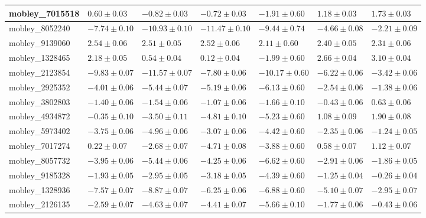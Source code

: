 \documentclass{article}
\begin{document}
\begin{landscape}
\begin{longtable}{|l{3.0cm}|l{3.0cm}|l{3.2cm}|l{3.6cm}|l{3.0cm}|l{3.0cm}|l{3.0cm}|}
mobley\_7015518	&	$	0.60	\pm	0.03	$	&	$	-0.82	\pm	0.03	$	&	$	-0.72	\pm	0.03	$	&	$	-1.91	\pm	0.60	$	&	$	1.18	\pm	0.03	$	&	$	1.73	\pm	0.03	$	\\ \hline
mobley\_8052240	&	$	-7.74	\pm	0.10	$	&	$	-10.93	\pm	0.10	$	&	$	-11.47	\pm	0.10	$	&	$	-9.44	\pm	0.74	$	&	$	-4.66	\pm	0.08	$	&	$	-2.21	\pm	0.09	$	\\ \hline
mobley\_9139060	&	$	2.54	\pm	0.06	$	&	$	2.51	\pm	0.05	$	&	$	2.52	\pm	0.06	$	&	$	2.11	\pm	0.60	$	&	$	2.40	\pm	0.05	$	&	$	2.31	\pm	0.06	$	\\ \hline
mobley\_1328465	&	$	2.18	\pm	0.05	$	&	$	0.54	\pm	0.04	$	&	$	0.12	\pm	0.04	$	&	$	-1.99	\pm	0.60	$	&	$	2.66	\pm	0.04	$	&	$	3.10	\pm	0.04	$	\\ \hline
mobley\_2123854	&	$	-9.83	\pm	0.07	$	&	$	-11.57	\pm	0.07	$	&	$	-7.80	\pm	0.06	$	&	$	-10.17	\pm	0.60	$	&	$	-6.22	\pm	0.06	$	&	$	-3.42	\pm	0.06	$	\\ \hline
mobley\_2925352	&	$	-4.01	\pm	0.06	$	&	$	-5.44	\pm	0.07	$	&	$	-5.19	\pm	0.06	$	&	$	-6.13	\pm	0.60	$	&	$	-2.54	\pm	0.06	$	&	$	-1.38	\pm	0.06	$	\\ \hline
mobley\_3802803	&	$	-1.40	\pm	0.06	$	&	$	-1.54	\pm	0.06	$	&	$	-1.07	\pm	0.06	$	&	$	-1.66	\pm	0.10	$	&	$	-0.43	\pm	0.06	$	&	$	0.63	\pm	0.06	$	\\ \hline
mobley\_4934872	&	$	-0.35	\pm	0.10	$	&	$	-3.50	\pm	0.11	$	&	$	-4.81	\pm	0.10	$	&	$	-5.23	\pm	0.60	$	&	$	1.08	\pm	0.09	$	&	$	1.90	\pm	0.08	$	\\ \hline
mobley\_5973402	&	$	-3.75	\pm	0.06	$	&	$	-4.96	\pm	0.06	$	&	$	-3.07	\pm	0.06	$	&	$	-4.42	\pm	0.60	$	&	$	-2.35	\pm	0.06	$	&	$	-1.24	\pm	0.05	$	\\ \hline
mobley\_7017274	&	$	0.22	\pm	0.07	$	&	$	-2.68	\pm	0.07	$	&	$	-4.71	\pm	0.08	$	&	$	-3.88	\pm	0.60	$	&	$	0.58	\pm	0.07	$	&	$	1.12	\pm	0.07	$	\\ \hline
mobley\_8057732	&	$	-3.95	\pm	0.06	$	&	$	-5.44	\pm	0.06	$	&	$	-4.25	\pm	0.06	$	&	$	-6.62	\pm	0.60	$	&	$	-2.91	\pm	0.06	$	&	$	-1.86	\pm	0.05	$	\\ \hline
mobley\_9185328	&	$	-1.93	\pm	0.05	$	&	$	-2.95	\pm	0.05	$	&	$	-3.18	\pm	0.05	$	&	$	-4.39	\pm	0.60	$	&	$	-1.25	\pm	0.04	$	&	$	-0.26	\pm	0.04	$	\\ \hline
mobley\_1328936	&	$	-7.57	\pm	0.07	$	&	$	-8.87	\pm	0.07	$	&	$	-6.25	\pm	0.06	$	&	$	-6.88	\pm	0.60	$	&	$	-5.10	\pm	0.07	$	&	$	-2.95	\pm	0.07	$	\\ \hline
mobley\_2126135	&	$	-2.59	\pm	0.07	$	&	$	-4.63	\pm	0.07	$	&	$	-4.41	\pm	0.07	$	&	$	-5.66	\pm	0.10	$	&	$	-1.77	\pm	0.06	$	&	$	-0.43	\pm	0.06	$	\\ \hline

\end{longtable}
\end{landscape}
\end{document}
